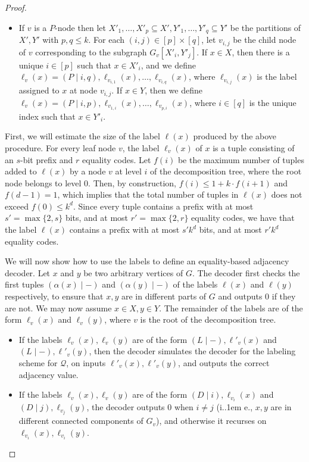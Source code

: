 \documentclass{theoretics}
\makeatletter
\newcommand\eqLabelSep{\mathbin|}
\newcommand{\cQ}{\ensuremath{\mathcal{Q}}}
\newcommand*\ie{i.\kern.1em e.\@\xspace} %
\makeatother
\begin{document}
\begin{proof}
\begin{itemize}
\item If $v$ is a $P$-node then let $X'_1, \dotsc, X'_p \subseteq X', Y'_1, \dotsc,
Y'_q \subseteq Y'$ be the partitions of $X',Y'$ with $p,q\le k$. 
For each $(i,j) \in [p]\times[q]$, let $v_{i,j}$ be the child
node of $v$ corresponding to the subgraph $G_v[X'_i,Y'_j]$. 
If $x \in X$, then there is a unique $i \in [p]$ such that $x \in X'_i$, and
we define $\ell_v(x) = (P \eqLabelSep i, q), \ell_{v_{i,1}}(x), \dotsc, \ell_{v_{i,q}}(x)$,
where $\ell_{v_{i,j}}(x)$ is the label assigned to $x$ at node $v_{i,j}$. 
If $x \in Y$, then we define $\ell_v(x) = (P \eqLabelSep i, p), \ell_{v_{1,i}}(x), \dotsc, \ell_{v_{p,i}}(x)$, 
where $i \in [q]$ is the unique index such that $x \in Y'_i$.
\end{itemize}
First, we will estimate the size of the label $\ell(x)$ produced by the above procedure.
For every leaf node $v$, the label $\ell_v(x)$ of $x$ is a tuple consisting of an $s$-bit prefix and $r$ equality codes.
Let $f(i)$ be the maximum number of tuples added to $\ell(x)$ by a node $v$ at level $i$ of the decomposition tree,
where the root node belongs to level $0$.
Then, by construction, $f(i) \leq 1 + k \cdot f(i+1)$ and $f(d-1) = 1$, which implies that the total
number of tuples in $\ell(x)$ does not exceed $f(0) \leq k^d$. 
Since every tuple contains a prefix
with at most $s' = \max\{2, s\}$ bits, and at most $r' = \max\{ 2, r \}$ equality codes, we have that
the label $\ell(x)$ contains a prefix with at most $s' k^d$ bits, and at most $r' k^d$ equality codes.

We will now show how to use the labels to define an equality-based adjacency decoder. 
Let $x$ and $y$ be two arbitrary vertices of $G$. The decoder first checks the first tuples 
$(\alpha(x) \eqLabelSep -)$ and $(\alpha(y) \eqLabelSep -)$ of the labels $\ell(x)$ and $\ell(y)$ respectively, to ensure that
$x,y$ are in different parts of $G$ and outputs 0 if they are not. We may now assume
$x \in X, y \in Y$. The remainder of the labels are of the form $\ell_v(x)$ and $\ell_v(y)$, where
$v$ is the root of the decomposition tree. 
\begin{itemize}
\item If the labels $\ell_v(x),\ell_v(y)$ are of the form $(L \eqLabelSep -), \ell'_v(x)$ and $(L \eqLabelSep -), \ell'_v(y)$, then the decoder simulates the decoder for the labeling scheme for $\cQ$, on inputs
$\ell'_v(x),\ell'_v(y)$, and outputs the correct adjacency value.

\item If the labels $\ell_v(x),\ell_v(y)$ are of the form $(D \eqLabelSep i), \ell_{v_i}(x)$ and
$(D \eqLabelSep j), \ell_{v_j}(y)$, the decoder outputs 0 when $i \neq j$ (\ie, $x,y$ are in different connected
components of $G_v$), and otherwise it recurses on $\ell_{v_i}(x), \ell_{v_i}(y)$.


\end{itemize}
\end{proof}
\end{document}
